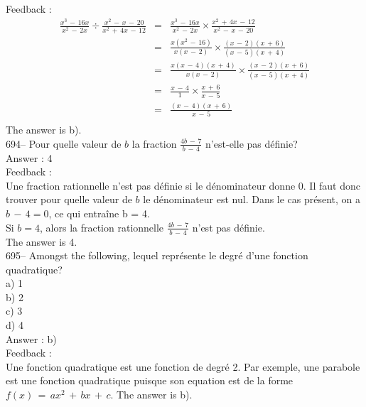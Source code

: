 \documentclass[letterpaper, 12pt]{article}
\begin{document}
Feedback : \\
\begin{eqnarray*}
\frac{x^{3}\,-\,16x}{x^{2}\,-\,2x}\div
\frac{x^{2}\,-\,x\,-\,20}{x^{2}\,+\,4x\,-\,12}&=&\frac{x^{3}\,-\,16x}{x^{2}\,-\,2x}\times\frac{x^{2}\,+\,4x\,-\,12}{x^{2}\,-\,x\,-\,20}\\[2mm]
&=&\frac{x(x^{2}\,-\,16)}{x(x\,-\,2)}\times
\frac{(x\,-\,2)(x\,+\,6)}{(x\,-\,5)(x\,+\,4)}\\[2mm]
&=&\frac{x(x\,-\,4)(x\,+\,4)}{x(x\,-\,2)}\times\frac{(x\,-\,2)(x\,+\,6)}{(x\,-\,5)(x\,+\,4)}\\[2mm]
&=&\frac{x\,-\,4}{1}\times \frac{x\,+\,6}{x\,-\,5}\\[2mm]
&=&\frac{(x\,-\,4)(x\,+\,6)}{x\,-\,5}\\[2mm]
\end{eqnarray*}
The answer is b).\\

694-- Pour quelle valeur de $b$ la fraction $\frac{4b\,-\,7}{b\,-\,4}$
n'est-elle pas d\'efinie?\\

Answer : 4\\

Feedback : \\
Une fraction rationnelle n'est pas d\'efinie si le d\'enominateur donne 0.
Il faut donc trouver pour quelle valeur de $b$ le d\'enominateur est nul.
Dans le cas pr\'esent, on a $b\,-\,4=0$, ce qui entra\^ine b = 4.\\

Si $b=4$, alors la fraction rationnelle $\frac{4b\,-\,7}{b\,-\,4}$ n'est pas
d\'efinie.\\
The answer is 4.\\

695-- Amongst the following, lequel repr\'esente le degr\'e d'une
fonction quadratique?\\
a) 1\\
b) 2\\
c) 3\\
d) 4\\

Answer : b)\\

Feedback : \\
Une fonction quadratique est une fonction de degr\'e 2.  Par exemple, une
parabole est une fonction quadratique puisque son equation est de la forme
$f(x)\,=\,ax^2 \,+\, bx \,+\, c$.  The answer is b).\\
\end{document}
